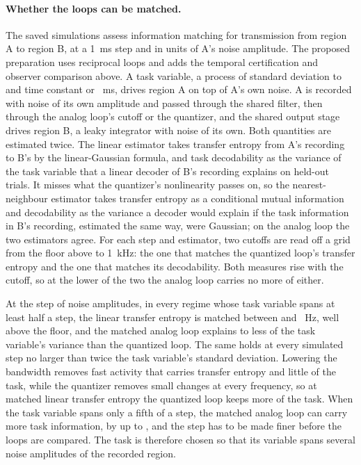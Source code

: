 \documentclass[12pt]{article}
\begin{document}
\paragraph{Whether the loops can be matched.} The saved simulations assess information matching for transmission from
region A to region B, at a 1~ms step and in units of A's noise amplitude.
The proposed preparation uses reciprocal loops and adds the temporal
certification and observer comparison above. A task variable, a process of
standard deviation \uBrTaskSdLow{} to \uBrTaskSdHigh{} and time constant
\uBrTaskTauShort{} or \uBrTaskTauLong{}~ms, drives region A on top of A's own
noise. A is recorded with noise of its own amplitude and passed through the
shared filter, then through the analog loop's cutoff or the quantizer, and the
shared output stage drives region B, a leaky integrator with noise of its own.
Both quantities are estimated twice. The linear estimator takes transfer
entropy from A's recording to B's by the linear-Gaussian formula, and task
decodability as the variance of the task variable that a linear decoder of B's
recording explains on held-out trials. It misses what the quantizer's
nonlinearity passes on, so the nearest-neighbour estimator takes transfer
entropy as a conditional mutual information \citep{kraskov2004,frenzel2007} and
decodability as the variance a decoder would explain if the task information
in B's recording, estimated the same way, were Gaussian; on the analog loop the
two estimators agree. For each step and estimator, two cutoffs are read off a
grid from the floor above to 1~kHz: the one that matches the quantized loop's
transfer entropy and the one that matches its decodability. Both measures rise
with the cutoff, so at the lower of the two the analog loop carries no more of
either.

At the step of \ueBridgeStepToNoise{} noise amplitudes, in every regime whose task
variable spans at least half a step, the linear transfer entropy is matched
between \uBrCutoffMin{} and \uBrCutoffMax{}~Hz, well above the floor, and the
matched analog loop explains \uBrGapMin{} to \uBrGapMax{} less of the task
variable's variance than the quantized loop. The same holds at every simulated
step no larger than twice the task variable's standard deviation. Lowering the
bandwidth removes fast activity that carries transfer entropy and little of the
task, while the quantizer removes small changes at every frequency, so at
matched linear transfer entropy the quantized loop keeps more of the task. When
the task variable spans only a fifth of a step, the matched analog loop can
carry more task information, by up to \uBrGapOtherMax{}, and the step has to be
made finer before the loops are compared. The task is therefore chosen so that
its variable spans several noise amplitudes of the recorded region.
\end{document}
